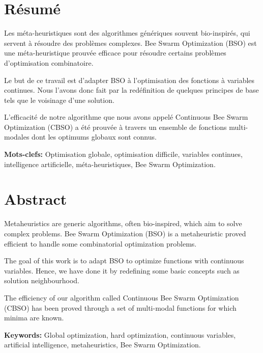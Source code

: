 \begin{titlepage}
	
	\vspace*{3em}
	
	\section*{\LARGE Résumé}
	
	\bigskip
	
	Les méta-heuristiques sont des algorithmes génériques souvent bio-inspirés, qui servent à résoudre des problèmes complexes.
	Bee Swarm Optimization (BSO) est une méta-heuristique prouvée efficace pour résoudre certains problèmes d'optimisation  combinatoire.\bigskip

	Le but de ce travail est d'adapter BSO à l'optimisation des fonctions à variables continues. Nous l'avons donc fait par la redéfinition de quelques principes de base tels que le voisinage d'une solution.\bigskip
	
	L'efficacité de notre algorithme que nous avons appelé Continuous Bee Swarm Optimization (CBSO) a été prouvée à travers un ensemble de fonctions multi-modales dont les optimums globaux sont connus.\bigskip
	
	\bigskip
	\textbf{Mots-clefs:} Optimisation globale, optimisation difficile, variables continues, intelligence artificielle, méta-heuristiques, Bee Swarm Optimization.
	
	\vspace{5em}
	
	\section*{\LARGE Abstract}
	
	\bigskip
	
	Metaheuristics are generic algorithms, often bio-inspired, which aim to solve complex problems.
	Bee Swarm Optimization (BSO) is a metaheuristic proved efficient to handle some combinatorial optimization problems.\bigskip
	
	The goal of this work is to adapt BSO to optimize functions with continuous variables. Hence, we have done it by redefining some basic concepts such as solution neighbourhood. \bigskip
	
	The efficiency of our algorithm called Continuous Bee Swarm Optimization (CBSO) has been proved through a set of multi-modal functions for which minima are known.\bigskip
	
	\bigskip
	
	\textbf{Keywords:} Global optimization, hard optimization, continuous variables, artificial intelligence, metaheuristics, Bee Swarm Optimization. 
	
	\vspace*{\fill}
	
\end{titlepage}
